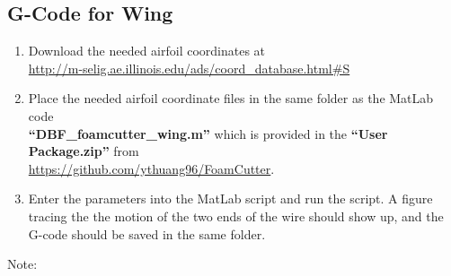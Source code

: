 \documentclass[titlepage,12pt,letter]{report}
\numberwithin{equation}{chapter}
\begin{document}
\subsection{G-Code for Wing}
\begin{enumerate}[noitemsep,topsep=0pt] 
	\item Download the needed airfoil coordinates at \\ \href{http://m-selig.ae.illinois.edu/ads/coord_database.html#S}{http://m-selig.ae.illinois.edu/ads/coord\_database.html\#S}
	\item Place the needed airfoil coordinate files in the same folder as the MatLab code \\ \textbf{``DBF\_foamcutter\_wing.m''} which is provided in the \textbf{``User Package.zip''} from \\ \href{https://github.com/ythuang96/FoamCutter}{https://github.com/ythuang96/FoamCutter}.
	\item Enter the parameters into the MatLab script and run the script. A figure tracing the the motion of the two ends of the wire should show up, and the G-code should be saved in the same folder.
\end{enumerate}

\noindent Note:
\end{document}
